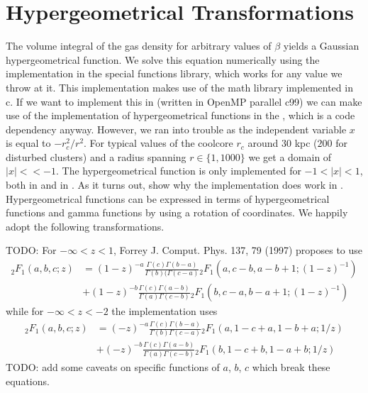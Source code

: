 \documentclass[MScProj_TLRH_ClusterEnergy.tex]{subfiles}
\begin{document}
\chapter{Hypergeometrical Transformations}
\label{sec:hypertrafo}
The volume integral of the gas density for arbitrary values of $\beta$ yields a Gaussian hypergeometrical function. We solve this equation numerically using the implementation in the  special functions library, which works for any value we throw at it. This implementation makes use of the  math library implemented in c. If we want to implement this in  (written in OpenMP parallel c99) we can make use of the implementation of hypergeometrical functions in the , which is a code dependency anyway. However, we ran into trouble as the independent variable $x$ is equal to $-r_c^2/r^2$. For typical values of the coolcore $r_c$ around $30$ kpc ($200$ for disturbed clusters) and a radius spanning $r \in \{1, 1000\}$ we get a domain of $|x| << -1$. The hypergeometrical function is only implemented for $-1 < |x| < 1$, both in  and in . As it turns out, \citet{2015arXiv150205624S} show why the implementation does work in . Hypergeometrical functions can be expressed in terms of hypergeometrical functions and gamma functions by using a rotation of coordinates. We happily adopt the following transformations.

TODO: For $-\infty < z < 1$, Forrey J. Comput. Phys. 137, 79 (1997) proposes to use \citep[eq. 15.3.8]{1972hmfw.book.....A}
\begin{align}
    {_2F_1}(a, b, c; z) &= (1-z)^{-a} \frac{\Gamma(c)\Gamma(b-a)}{\Gamma(b)(\Gamma(c-a)}
    {_2F_1}(a, c-b, a-b+1; (1-z)^{-1}) \nonumber \\
    &+ (1-z)^{-b} \frac{\Gamma(c)\Gamma(a-b)}{\Gamma(a)\Gamma(c-b)}
    {_2F_1}(b, c-a, b-a+1; (1-z)^{-1})
\end{align}
while for $-\infty < z < -2$ the  implementation uses \citep[eq. 15.3.7]{1972hmfw.book.....A}
\begin{align}
    {_2F_1}(a, b, c; z) &= (-z)^{-a} \frac{\Gamma(c)\Gamma(b-a)}{\Gamma(b)\Gamma(c-a)}
    {_2F_1}(a, 1-c+a, 1-b+a; 1/z) \nonumber \\
    &+ (-z)^{-b} \frac{\Gamma(c)\Gamma(a-b)}{\Gamma(a)\Gamma(c-b)}
    {_2F_1}(b, 1-c+b, 1-a+b; 1/z)
\end{align}
TODO: add some caveats on specific functions of $a$, $b$, $c$ which break these equations.
\end{document}
